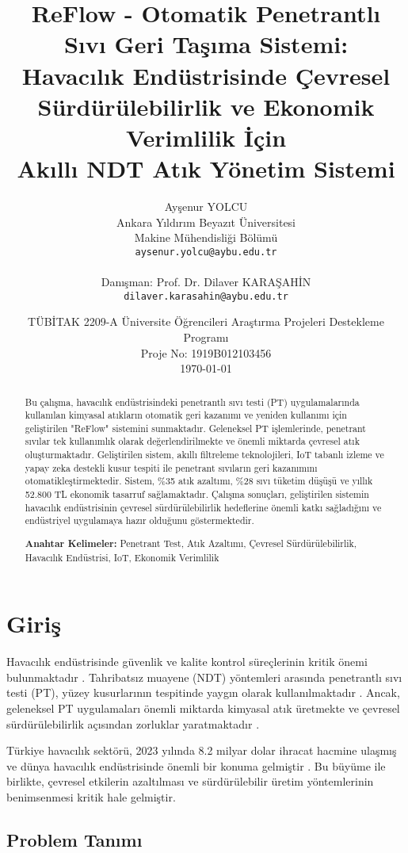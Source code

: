 \documentclass[12pt,a4paper]{article}
\title{\textbf{ReFlow - Otomatik Penetrantlı Sıvı Geri Taşıma Sistemi:\\
Havacılık Endüstrisinde Çevresel Sürdürülebilirlik ve Ekonomik Verimlilik İçin\\
Akıllı NDT Atık Yönetim Sistemi}}
\author{Ayşenur YOLCU\\
Ankara Yıldırım Beyazıt Üniversitesi\\
Makine Mühendisliği Bölümü\\
\texttt{aysenur.yolcu@aybu.edu.tr}\\
\\
Danışman: Prof. Dr. Dilaver KARAŞAHİN\\
\texttt{dilaver.karasahin@aybu.edu.tr}}
\date{TÜBİTAK 2209-A Üniversite Öğrencileri Araştırma Projeleri Destekleme Programı\\
Proje No: 1919B012103456\\
\today}
\begin{document}
\maketitle

\begin{abstract}
Bu çalışma, havacılık endüstrisindeki penetrantlı sıvı testi (PT) uygulamalarında kullanılan kimyasal atıkların otomatik geri kazanımı ve yeniden kullanımı için geliştirilen "ReFlow" sistemini sunmaktadır. Geleneksel PT işlemlerinde, penetrant sıvılar tek kullanımlık olarak değerlendirilmekte ve önemli miktarda çevresel atık oluşturmaktadır. Geliştirilen sistem, akıllı filtreleme teknolojileri, IoT tabanlı izleme ve yapay zeka destekli kusur tespiti ile penetrant sıvıların geri kazanımını otomatikleştirmektedir. Sistem, \%35 atık azaltımı, \%28 sıvı tüketim düşüşü ve yıllık 52.800 TL ekonomik tasarruf sağlamaktadır. Çalışma sonuçları, geliştirilen sistemin havacılık endüstrisinin çevresel sürdürülebilirlik hedeflerine önemli katkı sağladığını ve endüstriyel uygulamaya hazır olduğunu göstermektedir.

\textbf{Anahtar Kelimeler:} Penetrant Test, Atık Azaltımı, Çevresel Sürdürülebilirlik, Havacılık Endüstrisi, IoT, Ekonomik Verimlilik
\end{abstract}

\tableofcontents
\newpage

\section{Giriş}

Havacılık endüstrisinde güvenlik ve kalite kontrol süreçlerinin kritik önemi bulunmaktadır \cite{hellier2012handbook}. Tahribatsız muayene (NDT) yöntemleri arasında penetrantlı sıvı testi (PT), yüzey kusurlarının tespitinde yaygın olarak kullanılmaktadır \cite{dwivedi2018advances}. Ancak, geleneksel PT uygulamaları önemli miktarda kimyasal atık üretmekte ve çevresel sürdürülebilirlik açısından zorluklar yaratmaktadır \cite{garcia2019environmental}.

Türkiye havacılık sektörü, 2023 yılında 8.2 milyar dolar ihracat hacmine ulaşmış ve dünya havacılık endüstrisinde önemli bir konuma gelmiştir \cite{aerospace2020sustainability}. Bu büyüme ile birlikte, çevresel etkilerin azaltılması ve sürdürülebilir üretim yöntemlerinin benimsenmesi kritik hale gelmiştir.

\subsection{Problem Tanımı}
\end{document}
